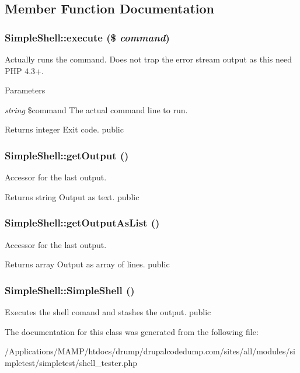 \subsection{Member Function Documentation}
\hypertarget{class_simple_shell_af50daa9990b46e1e978c6f17c371238d}{
\subsubsection[{execute}]{\setlength{\rightskip}{0pt plus 5cm}SimpleShell::execute (\$ {\em command})}}
\label{class_simple_shell_af50daa9990b46e1e978c6f17c371238d}
Actually runs the command. Does not trap the error stream output as this need PHP 4.3+. 
\begin{DoxyParams}{Parameters}
\item[{\em string}]\$command The actual command line to run. \end{DoxyParams}
\begin{DoxyReturn}{Returns}
integer Exit code.  public 
\end{DoxyReturn}
\hypertarget{class_simple_shell_ad4bbebad7ddf292f1acaffc00ec85dd0}{
\subsubsection[{getOutput}]{\setlength{\rightskip}{0pt plus 5cm}SimpleShell::getOutput ()}}
\label{class_simple_shell_ad4bbebad7ddf292f1acaffc00ec85dd0}
Accessor for the last output. \begin{DoxyReturn}{Returns}
string Output as text.  public 
\end{DoxyReturn}
\hypertarget{class_simple_shell_a986a839480a739e7fc9b14864bfa7e20}{
\subsubsection[{getOutputAsList}]{\setlength{\rightskip}{0pt plus 5cm}SimpleShell::getOutputAsList ()}}
\label{class_simple_shell_a986a839480a739e7fc9b14864bfa7e20}
Accessor for the last output. \begin{DoxyReturn}{Returns}
array Output as array of lines.  public 
\end{DoxyReturn}
\hypertarget{class_simple_shell_a78ce94ced3359a08496e33956aee82d3}{
\subsubsection[{SimpleShell}]{\setlength{\rightskip}{0pt plus 5cm}SimpleShell::SimpleShell ()}}
\label{class_simple_shell_a78ce94ced3359a08496e33956aee82d3}
Executes the shell comand and stashes the output.  public 

The documentation for this class was generated from the following file:\begin{DoxyCompactItemize}
\item 
/Applications/MAMP/htdocs/drump/drupalcodedump.com/sites/all/modules/simpletest/simpletest/shell\_\-tester.php\end{DoxyCompactItemize}
